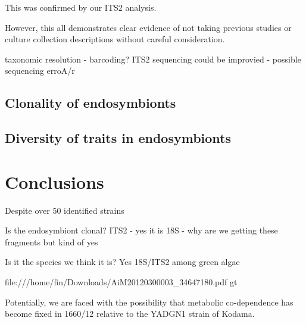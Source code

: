 This was confirmed by our ITS2 analysis.


However, this all demonstrates clear evidence of not taking previous studies
or culture collection descriptions without careful consideration.





taxonomic resolution - barcoding?
ITS2 sequencing could be improvied - possible sequencing erroA/r 


\subsection{Clonality of endosymbionts}



\subsection{Diversity of traits in endosymbionts}



\section{Conclusions}

Despite over 50 identified strains 


Is the endosymbiont clonal?
ITS2 - yes it is
18S - why are we getting these fragments but kind of yes

Is it the species we think it is?
Yes 18S/ITS2 among green algae


file:///home/fin/Downloads/AiM20120300003_34647180.pdf
gt





Potentially, we are faced with the possibility that metabolic co-dependence has become fixed in 1660/12
relative to the YADGN1 strain of Kodama.



